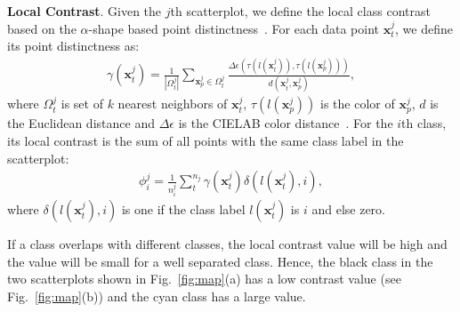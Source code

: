 \vspace{2mm}
\noindent\textbf{Local Contrast}.
Given the $j$th scatterplot, we define the local class contrast based on the $\alpha$-shape based point distinctness~\cite{Lu21}.  For each data point $\mathbf{x}^j_t$, we define its point distinctness  as:
\begin{align}
 \gamma (\mathbf{x}^j_t)=\frac{1}{|\Omega^j_t|} \sum_{\mathbf{x}^j_p \in \Omega^j_t}  \frac{\Delta\epsilon(\tau(l(\mathbf{x}^j_t)),\tau(l(\mathbf{x}^j_p)))}{d(\mathbf{x}^j_t,\mathbf{x}^j_p)} \nonumber ,
\end{align}
where $\Omega^j_t$ is set of $k$ nearest neighbors of $\mathbf{x}^j_t$, $\tau(l(\mathbf{x}^j_p))$ is the color of $\mathbf{x}^j_p$,  $d$ is the Euclidean distance and $\Delta\epsilon$ is the CIELAB color distance~\cite{sharma2005ciede2000}.
For the $i$th class, its local contrast is the sum of all points with the same class label in the scatterplot:
\begin{align}\label{eq:nc}
 \phi^j_i = \frac{1}{n_i^j}\sum^{n_j}_{t}\gamma(\mathbf{x}^j_t) \delta(l(\mathbf{x}^j_t),i),
\end{align}
where $\delta(l(\mathbf{x}^j_t),i)$ is one if the class label $l(\mathbf{x}^j_t)$ is $i$ and else zero.

If a class overlaps with different classes, the local contrast value will be high and the value will be small for a well separated class. Hence, the black class  in the  two scatterplots shown in Fig.~\ref{fig:map}(a)  has a low contrast value (see Fig.~\ref{fig:map}(b)) and the cyan class has a large value.


